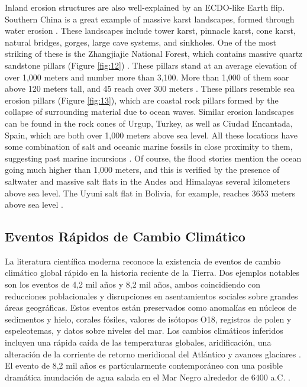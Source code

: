 \documentclass[10pt,twocolumn,letterpaper]{article}
\begin{document}
Inland erosion structures are also well-explained by an ECDO-like Earth flip. Southern China is a great example of massive karst landscapes, formed through water erosion \cite{82}. These landscapes include tower karst, pinnacle karst, cone karst, natural bridges, gorges, large cave systems, and sinkholes. One of the most striking of these is the Zhangjiajie National Forest, which contains massive quartz sandstone pillars (Figure \ref{fig:12}) \cite{84}. These pillars stand at an average elevation of over 1,000 meters and number more than 3,100. More than 1,000 of them soar above 120 meters tall, and 45 reach over 300 meters \cite{85}. These pillars resemble sea erosion pillars (Figure \ref{fig:13}), which are coastal rock pillars formed by the collapse of surrounding material due to ocean waves. Similar erosion landscapes can be found in the rock cones of Urgup, Turkey, as well as Ciudad Encantada, Spain, which are both over 1,000 meters above sea level. All these locations have some combination of salt and oceanic marine fossils in close proximity to them, suggesting past marine incursions \cite{15,86,87}. Of course, the flood stories \cite{3} mention the ocean going much higher than 1,000 meters, and this is verified by the presence of saltwater and massive salt flats in the Andes and Himalayas several kilometers above sea level. The Uyuni salt flat in Bolivia, for example, reaches 3653 meters above sea level \cite{94}.

\subsection{Eventos Rápidos de Cambio Climático}

La literatura científica moderna reconoce la existencia de eventos de cambio climático global rápido en la historia reciente de la Tierra. Dos ejemplos notables son los eventos de 4,2 mil años y 8,2 mil años, ambos coincidiendo con reducciones poblacionales y disrupciones en asentamientos sociales sobre grandes áreas geográficas. Estos eventos están preservados como anomalías en núcleos de sedimentos y hielo, corales fósiles, valores de isótopos O18, registros de polen y espeleotemas, y datos sobre niveles del mar. Los cambios climáticos inferidos incluyen una rápida caída de las temperaturas globales, aridificación, una alteración de la corriente de retorno meridional del Atlántico y avances glaciares \cite{90,91,92}. El evento de 8,2 mil años es particularmente contemporáneo con una posible dramática inundación de agua salada en el Mar Negro alrededor de 6400 a.C. \cite{93}.
\end{document}
